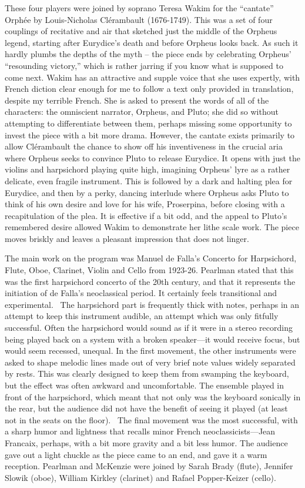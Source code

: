 These four players were joined by soprano Teresa Wakim for the “cantate” Orphée by Louis-Nicholas Cl­érambault (1676-1749). This was a set of four couplings of recitative and air that sketched just the middle of the Orpheus legend, starting after Eurydice’s death and before Orpheus looks back. As such it hardly plumbs the depths of the myth -- the piece ends by celebrating Orpheus’ “resounding victory,” which is rather jarring if you know what is supposed to come next. Wakim has an attractive and supple voice that she uses expertly, with French diction clear enough for me to follow a text only provided in translation, despite my terrible French. She is asked to present the words of all of the characters: the omniscient narrator, Orpheus, and Pluto; she did so without attempting to differentiate between them, perhaps missing some opportunity to invest the piece with a bit more drama. However, the cantate exists primarily to allow Clérambault the chance to show off his inventiveness in the crucial aria where Orpheus seeks to convince Pluto to release Eurydice. It opens with just the violins and harpsichord playing quite high, imagining Orpheus’ lyre as a rather delicate, even fragile instrument. This is followed by a dark and halting plea for Eurydice, and then by a perky, dancing interlude where Orpheus asks Pluto to think of his own desire and love for his wife, Proserpina, before closing with a recapitulation of the plea. It is effective if a bit odd, and the appeal to Pluto’s remembered desire allowed Wakim to demonstrate her lithe scale work. The piece moves briskly and leaves a pleasant impression that does not linger.

The main work on the program was Manuel de Falla’s Concerto for Harpsichord, Flute, Oboe, Clarinet, Violin and Cello from 1923-26. Pearlman stated that this was the first harpsichord concerto of the 20th century, and that it represents the initiation of de Falla’s neoclassical period. It certainly feels transitional and experimental.  The harpsichord part is frequently thick with notes, perhaps in an attempt to keep this instrument audible, an attempt which was only fitfully successful. Often the harpsichord would sound as if it were in a stereo recording being played back on a system with a broken speaker—it would receive focus, but would seem recessed, unequal. In the first movement, the other instruments were asked to shape melodic lines made out of very brief note values widely separated by rests. This was clearly designed to keep them from swamping the keyboard, but the effect was often awkward and uncomfortable. The ensemble played in front of the harpsichord, which meant that not only was the keyboard sonically in the rear, but the audience did not have the benefit of seeing it played (at least not in the seats on the floor).  The final movement was the most successful, with a sharp humor and lightness that recalls minor French neoclassicists—Jean Francaix, perhaps, with a bit more gravity and a bit less humor. The audience gave out a light chuckle as the piece came to an end, and gave it a warm reception. Pearlman and McKenzie were joined by Sarah Brady (flute), Jennifer Slowik (oboe), William Kirkley (clarinet) and Rafael Popper-Keizer (cello).

